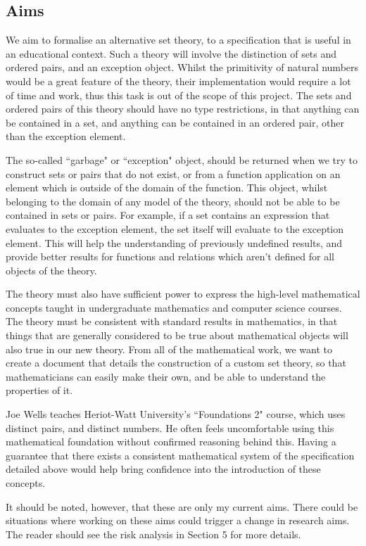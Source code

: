 \documentclass[11pt]{article}
\theoremstyle{definition}
\theoremstyle{theorem}
\theoremstyle{lemma}
\begin{document}
\subsection{Aims}
We aim to formalise an alternative set theory, to a specification that is useful in an educational context.
Such a theory will involve the distinction of sets and ordered pairs, and an exception object.
Whilst the primitivity of natural numbers would be a great feature of the theory, their implementation would require a lot of time and work, thus this task is out of the scope of this project.
The sets and ordered pairs of this theory should have no type restrictions, in that anything can be contained in a set, and anything can be contained in an ordered pair, other than the exception element.

The so-called ``garbage" or ``exception" object, should be returned when we try to construct sets or pairs that do not exist, or from a function application on an element which is outside of the domain of the function.
This object, whilst belonging to the domain of any model of the theory, should not be able to be contained in sets or pairs.
For example, if a set contains an expression that evaluates to the exception element, the set itself will evaluate to the exception element.
This will help the understanding of previously undefined results, and provide better results for functions and relations which aren't defined for all objects of the theory.

The theory must also have sufficient power to express the high-level mathematical concepts taught in undergraduate mathematics and computer science courses.
The theory must be consistent with standard results in mathematics, in that things that are generally considered to be true about mathematical objects will also true in our new theory.
From all of the mathematical work, we want to create a document that details the construction of a custom set theory, so that mathematicians can easily make their own, and be able to understand the properties of it.

Joe Wells teaches Heriot-Watt University's ``Foundations 2" course, which uses distinct pairs, and distinct numbers.
He often feels uncomfortable using this mathematical foundation without confirmed reasoning behind this.
Having a guarantee that there exists a consistent mathematical system of the specification detailed above would help bring confidence into the introduction of these concepts.

It should be noted, however, that these are only my current aims.
There could be situations where working on these aims could trigger a change in research aims.
The reader should see the risk analysis in Section 5 for more details.
\end{document}
